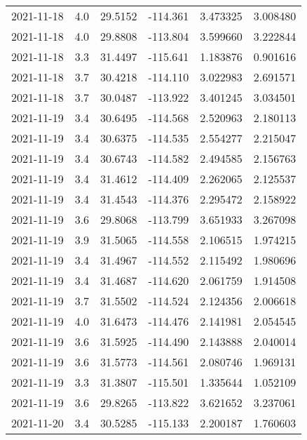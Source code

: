 \begin{tabular}{lrrrrr}
2021-11-18 &       4.0 &  29.5152 &  -114.361 &         3.473325 &         3.008480 \\
2021-11-18 &       4.0 &  29.8808 &  -113.804 &         3.599660 &         3.222844 \\
2021-11-18 &       3.3 &  31.4497 &  -115.641 &         1.183876 &         0.901616 \\
2021-11-18 &       3.7 &  30.4218 &  -114.110 &         3.022983 &         2.691571 \\
2021-11-18 &       3.7 &  30.0487 &  -113.922 &         3.401245 &         3.034501 \\
2021-11-19 &       3.4 &  30.6495 &  -114.568 &         2.520963 &         2.180113 \\
2021-11-19 &       3.4 &  30.6375 &  -114.535 &         2.554277 &         2.215047 \\
2021-11-19 &       3.4 &  30.6743 &  -114.582 &         2.494585 &         2.156763 \\
2021-11-19 &       3.4 &  31.4612 &  -114.409 &         2.262065 &         2.125537 \\
2021-11-19 &       3.4 &  31.4543 &  -114.376 &         2.295472 &         2.158922 \\
2021-11-19 &       3.6 &  29.8068 &  -113.799 &         3.651933 &         3.267098 \\
2021-11-19 &       3.9 &  31.5065 &  -114.558 &         2.106515 &         1.974215 \\
2021-11-19 &       3.4 &  31.4967 &  -114.552 &         2.115492 &         1.980696 \\
2021-11-19 &       3.4 &  31.4687 &  -114.620 &         2.061759 &         1.914508 \\
2021-11-19 &       3.7 &  31.5502 &  -114.524 &         2.124356 &         2.006618 \\
2021-11-19 &       4.0 &  31.6473 &  -114.476 &         2.141981 &         2.054545 \\
2021-11-19 &       3.6 &  31.5925 &  -114.490 &         2.143888 &         2.040014 \\
2021-11-19 &       3.6 &  31.5773 &  -114.561 &         2.080746 &         1.969131 \\
2021-11-19 &       3.3 &  31.3807 &  -115.501 &         1.335644 &         1.052109 \\
2021-11-19 &       3.6 &  29.8265 &  -113.822 &         3.621652 &         3.237061 \\
2021-11-20 &       3.4 &  30.5285 &  -115.133 &         2.200187 &         1.760603 \\

\end{tabular}
